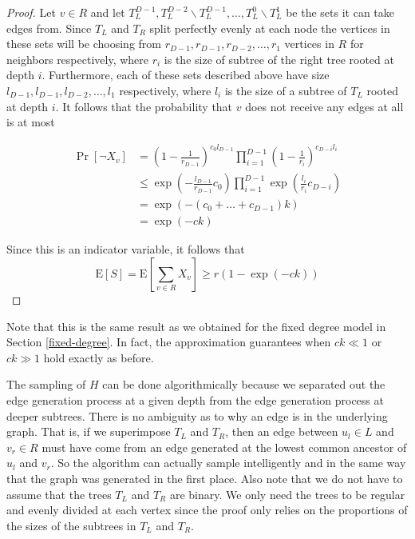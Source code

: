 \documentclass[11pt]{article}
\newcommand{\E}{\text{E}}
\newcommand{\vs}{\vspace{0.2cm}}
\begin{document}
\begin{proof}
Let $v\in R$ and let $T_L^{D-1}, T_L^{D-2}\backslash T_L^{D-1},
\ldots, T_L^0\backslash T_L^1$ be the sets it can take edges
from. Since $T_L$ and $T_R$ split perfectly evenly at each node the
vertices in these sets will be choosing from $r_{D-1}, r_{D-1},
r_{D-2},\ldots, r_{1}$ vertices in $R$ for neighbors respectively,
where $r_i$ is the size of subtree of the right tree rooted at depth
$i$. Furthermore, each of these sets described above have size
$l_{D-1}, l_{D-1}, l_{D-2}, \ldots, l_{1}$ respectively, where $l_i$
is the size of a subtree of $T_L$ rooted at depth $i$. It follows that
the probability that $v$ does not receive any edges at all is at most

\begin{align*}
	      \Pr[\lnot X_v] 
	&=    \left(1-\frac{1}{r_{D-1}}\right)^{c_0l_{D-1}}\prod_{i=1}^{D-1}\left(1 - \frac{1}{r_i}\right)^{c_{D-i} l_i} \\
	&\leq \exp\left(-\frac{l_{D-1}}{r_{D-1}}c_0\right)\prod_{i=1}^{D-1} \exp\left(\frac{l_i}{r_i}c_{D-i}\right) \\
	&=    \exp\left(-(c_0 + \ldots + c_{D-1})k\right) \\
	&=    \exp(-ck)
\end{align*}

Since this is an indicator variable, it follows that 
\[ \E[S] = \E\left[\sum_{v \in R} X_v \right] \geq r \left(1-\exp(-ck)\right) \]
\end{proof}

Note that this is the same result as we obtained for the fixed degree
model in Section \ref{fixed-degree}. In fact, the approximation
guarantees when $ck \ll 1$ or $ck \gg 1$ hold exactly as before.\vs

The sampling of $H$ can be done algorithmically because we separated
out the edge generation process at a given depth from the edge
generation process at deeper subtrees. There is no ambiguity as to why
an edge is in the underlying graph. That is, if we superimpose $T_L$
and $T_R$, then an edge between $u_l\in L$ and $v_r\in R$ must have
come from an edge generated at the lowest common ancestor of $u_l$ and
$v_r$. So the algorithm can actually sample intelligently and in the
same way that the graph was generated in the first place. Also note
that we do not have to assume that the trees $T_L$ and $T_R$ are
binary. We only need the trees to be regular and evenly divided at
each vertex since the proof only relies on the proportions of the
sizes of the subtrees in $T_L$ and $T_R$.
\end{document}
